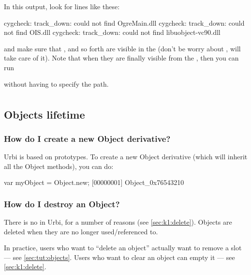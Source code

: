 In this output, look for lines like these:

\begin{shell}
cygcheck: track_down: could not find OgreMain.dll
cygcheck: track_down: could not find OIS.dll
cygcheck: track_down: could not find libuobject-vc90.dll
\end{shell}

\noindent
and make sure that ,  and so forth are
visible in the  (don't be worry about ,
 will take care of it).  Note that when they are
finally visible from the , then you can run


\noindent
without having to specify the path.

\section{\us}
\subsection{Objects lifetime}

\subsubsection{How do I create a new Object derivative?}
Urbi is based on prototypes. To create a new Object derivative (which
will inherit all the Object methods), you can do:

\begin{urbiscript}
var myObject = Object.new;
[00000001] Object_0x76543210
\end{urbiscript}

\subsubsection{How do I destroy an Object?}
There is no  in Urbi, for a number of reasons (see
\autoref{sec:k1:delete}).  Objects are deleted when they are no longer
used/referenced to.

In practice, users who want to ``delete an object'' actually want to remove
a slot --- see \autoref{sec:tut:objects}.  Users who want to clear an object
can empty it --- see \autoref{sec:k1:delete}.

